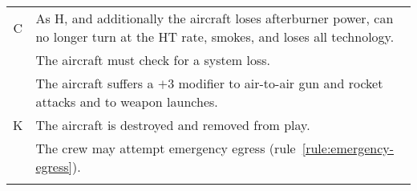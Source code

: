 \begin{onecolumntable}[t!]
{\begin{tabularx}{\linewidth}{cX}
\addlinespace
C&As H, and additionally the aircraft loses afterburner power, can no longer turn at the HT rate, smokes, and loses all technology.\\
\addlinespace
&The aircraft must check for a system loss.\\
\addlinespace
&The aircraft suffers a $+3$ modifier to air-to-air gun and rocket attacks and to weapon launches.\\
\addlinespace
K&The aircraft is destroyed and removed from play.\\
\addlinespace
&The crew may attempt emergency egress (rule~\ref{rule:emergency-egress}).\\
\addlinespace
\bottomrule
\end{tabularx}

}
\end{onecolumntable}